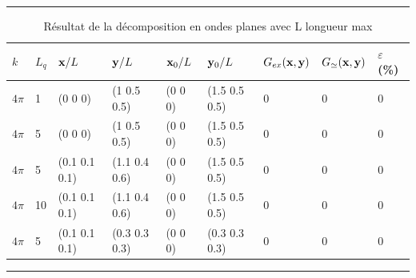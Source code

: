 \documentclass[10pt]{article}
\begin{document}
\rule{8cm}{1pt}

\begin{table}[H]
\centering
\begin{tabular}{m{0.5cm} m{0.5cm} | m{2cm} m{2cm} m{2cm} m{2cm} | m{2cm} m{2cm} m{1cm}} 
   \hline
    $k$ & $L_q$ & ${\bf x}/L$ & ${\bf y}/L$ & ${\bf x}_0/L$ & ${\bf y}_0/L$ & $G_{ex}({\bf x}, {\bf y})$ & $G_{\simeq}({\bf x},{\bf y})$ & $\varepsilon$ (\%) \\
    \toprule
    \toprule
    $4\pi$ & 1 & (0 0 0) & (1 0.5 0.5) & (0 0 0) & (1.5 0.5 0.5) & 0 & 0 & 0\\
    $4\pi$ & 5 & (0 0 0) & (1 0.5 0.5) & (0 0 0) & (1.5 0.5 0.5) & 0 & 0 & 0\\ \hline
    $4\pi$ & 5 & (0.1 0.1 0.1) & (1.1 0.4 0.6) & (0 0 0) & (1.5 0.5 0.5) & 0 & 0 & 0\\
    $4\pi$ & 10 & (0.1 0.1 0.1) & (1.1 0.4 0.6) & (0 0 0) & (1.5 0.5 0.5) & 0 & 0 & 0\\ \hline
    $4\pi$ & 5 & (0.1 0.1 0.1) & (0.3 0.3 0.3) & (0 0 0) & (0.3 0.3 0.3) & 0 & 0 & 0\\
    \hline
\end{tabular}
\caption{Résultat de la décomposition en ondes planes avec L longueur max}
\end{table}



\hfill\rule{8cm}{1pt}
\end{document}
